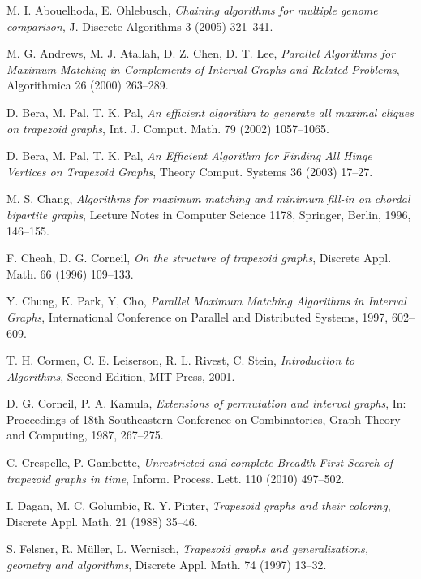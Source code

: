 \documentclass[11pt,letter]{article}
\begin{document}
\begin{thebibliography}{99}

    M. I. Abouelhoda, E. Ohlebusch,
    \emph{Chaining algorithms for multiple genome comparison},
    J. Discrete Algorithms 3 (2005) 321--341.

    M. G. Andrews, M. J. Atallah, D. Z. Chen, D. T. Lee,
    \emph{Parallel Algorithms for Maximum Matching in Complements of Interval Graphs and Related
    Problems}, Algorithmica 26 (2000) 263--289.

    D. Bera, M. Pal, T. K. Pal,
    \emph{An efficient algorithm to generate all maximal cliques on trapezoid graphs},
    Int. J. Comput. Math. 79 (2002) 1057--1065.

    D. Bera, M. Pal, T. K. Pal,
    \emph{An Efficient Algorithm for Finding All Hinge Vertices on Trapezoid Graphs},
    Theory Comput. Systems 36 (2003) 17--27.

    M. S. Chang,
    \emph{Algorithms for maximum matching and minimum fill-in on chordal bipartite graphs},
    Lecture Notes in Computer Science 1178, Springer, Berlin, 1996, 146--155.

    F. Cheah, D. G. Corneil,
    \emph{On the structure of trapezoid graphs},
    Discrete Appl. Math. 66 (1996) 109--133.

    Y. Chung, K. Park, Y, Cho,
    \emph{Parallel Maximum Matching Algorithms in Interval Graphs},
    International Conference on Parallel and Distributed Systems, 1997, 602--609.

    T. H. Cormen, C. E. Leiserson, R. L. Rivest, C. Stein,
    \emph{Introduction to Algorithms},
    Second Edition, MIT Press, 2001.

    D. G. Corneil, P. A. Kamula,
    \emph{Extensions of permutation and interval graphs},
    In: Proceedings of 18th Southeastern Conference on Combinatorics, Graph Theory and Computing, 1987, 267--275.

    C. Crespelle, P. Gambette,
    \emph{Unrestricted and complete Breadth First Search of trapezoid graphs in  time},
    Inform. Process. Lett. 110 (2010) 497--502.

    I. Dagan, M. C. Golumbic, R. Y. Pinter,
    \emph{Trapezoid graphs and their coloring},
    Discrete Appl. Math. 21 (1988) 35--46.

    S. Felsner, R. M\" uller, L. Wernisch,
    \emph{Trapezoid graphs and generalizations, geometry and algorithms},
    Discrete Appl. Math. 74 (1997) 13--32.


\end{thebibliography}
\end{document}

